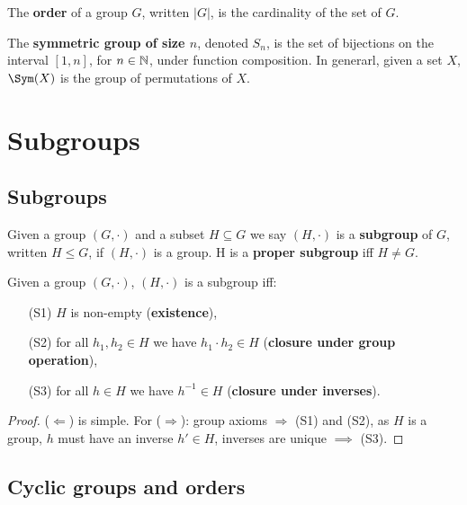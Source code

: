\documentclass[../Year1/Year1.tex]{subfiles}
\begin{document}
\begin{definition}
    The \textbf{order} of a group $G$, written $|G|$, is the cardinality of the set of $G$.
\end{definition}

\begin{example}
    The \textbf{symmetric group of size $n$}, denoted $S_n$, is the set of bijections on the interval $[1,n]$, for $n\in\mathbb{N}$, under function composition. In generarl, given a set $X$, $\Sym(X)$ is the group of permutations of $X$.
\end{example}

\section{Subgroups}

\subsection{Subgroups}

\begin{definition}[Subgroup]
    Given a group $(G,\cdot)$ and a subset $H\subseteq G$ we say $(H,\cdot)$ is a \textbf{subgroup} of $G$, written $H\leq G$, if $(H,\cdot)$ is a group. H is a \textbf{proper subgroup} iff $H\neq G$.
\end{definition}

\begin{theorem}
    Given a group $(G,\cdot)$, $(H,\cdot)$ is a subgroup iff: \begin{enumerate}
        \item[(S1)] $H$ is non-empty (\textbf{existence}),
        \item[(S2)] for all $h_1,h_2\in H$ we have $h_1\cdot h_2\in H$ (\textbf{closure under group operation}),
        \item[(S3)] for all $h\in H$ we have $h^{-1}\in H$ (\textbf{closure under inverses}).
    \end{enumerate}
\end{theorem}
 
\begin{proof}
    ($\Leftarrow$) is simple. For ($\Rightarrow$): group axioms $\Rightarrow$ (S1) and (S2), as $H$ is a group, $h$ must have an inverse $h'\in H$, inverses are unique $\implies$ (S3).
\end{proof}

\subsection{Cyclic groups and orders}
\end{document}

